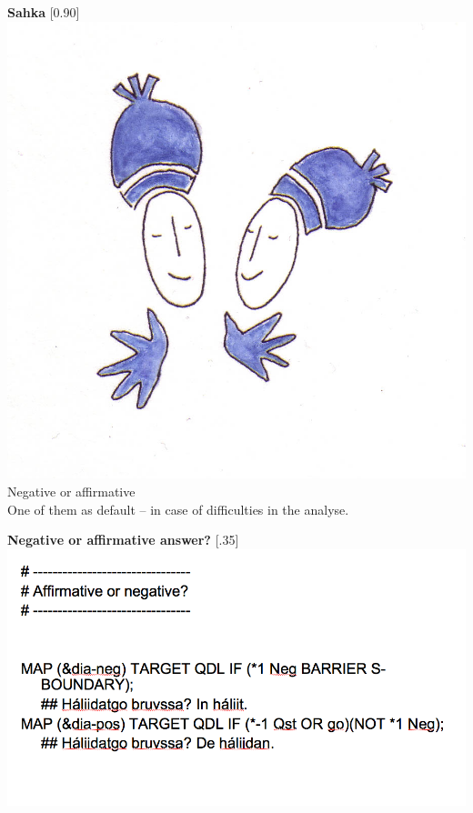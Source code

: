 \documentclass[landscape,norsk,11pt]{seminar}
\begin{document}
\begin{slide}
\newslide
\textbf{Sahka}
\scalebox{0.90}[0.90]{\includegraphics{img/sahka.png}} \\

\newslide
Negative or affirmative \\
One of them as default -- in case of difficulties in the analyse.

\newslide
\textbf{Negative or affirmative answer?}
\scalebox{.35}[.35]{\includegraphics{img/aff_or_neg.png}}




\end{slide}
\end{document}
